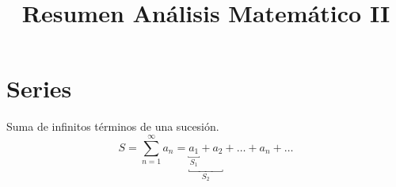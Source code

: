 \documentclass[a4paper]{article}
\title{Resumen Análisis Matemático II}
\date{}
\begin{document}
\maketitle
\section{Series}
Suma de infinitos términos de una sucesión.
\[
S= \sum_{n=1}^{\infty}a_n= \underbracket{\underbracket{a_1}_{S_1} + a_2}_{S_2} +\ldots+a_n+\ldots
\]
\end{document}
